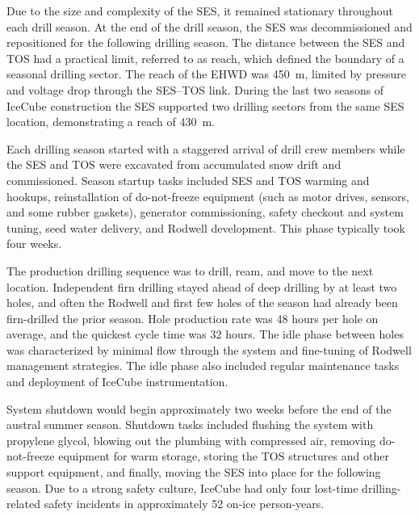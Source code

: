 Due to the size and complexity of the SES, it remained stationary
throughout each drill season.  At the end of the drill season, the SES was
decommissioned and repositioned for the following drilling season.  The
distance between the SES and TOS had a practical limit, referred to as
reach, which defined the boundary of a seasonal drilling sector.  The reach
of the EHWD was 450~m, limited by pressure and voltage drop through the
SES--TOS link.  During the last two seasons of IceCube construction the SES
supported two drilling sectors from the same SES location, demonstrating a
reach of 430~m.

Each drilling season started with a staggered arrival of drill crew members
while the SES and TOS were excavated from accumulated snow drift and commissioned.  Season startup
tasks included SES and TOS warming and hookups, reinstallation of
do-not-freeze equipment (such as motor drives, sensors, and some
rubber gaskets), generator commissioning, safety checkout and system
tuning, seed water delivery, and Rodwell development.  This phase typically
took four weeks.

The production drilling sequence was to drill, ream, and move to the next
location.  Independent firn drilling stayed ahead of deep drilling by at
least two holes, and often the Rodwell and first few holes of
the season had already been firn-drilled the prior season. Hole production rate was 48 hours per hole on average,
and the quickest cycle time was 32 hours. The idle phase
between holes was characterized by minimal flow through the
system and fine-tuning of Rodwell management strategies.  The idle phase
also included regular maintenance tasks and deployment of IceCube
instrumentation.  

System shutdown would begin approximately two weeks before the end of the
austral summer season. Shutdown tasks included flushing the system with
propylene glycol, blowing out the plumbing with compressed air, removing
do-not-freeze equipment for warm storage, storing the TOS structures and
other support equipment, and finally, moving the SES into place for the
following season.  Due to a strong safety culture, IceCube had only
four lost-time drilling-related safety incidents in approximately 52 on-ice 
person-years. 


